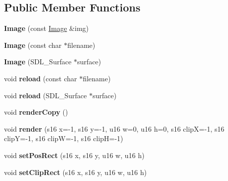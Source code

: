 \subsection*{Public Member Functions}
\begin{DoxyCompactItemize}
\item 
\hypertarget{classImage_aa44ed77d00d96d2c878b050835f828c4}{{\bfseries Image} (const \hyperlink{classImage}{Image} \&img)}\label{classImage_aa44ed77d00d96d2c878b050835f828c4}

\item 
\hypertarget{classImage_a9700f58efb58b13e23666f19c67d3839}{{\bfseries Image} (const char $\ast$filename)}\label{classImage_a9700f58efb58b13e23666f19c67d3839}

\item 
\hypertarget{classImage_af7e0eee4779e4621a9f6e296800c7d52}{{\bfseries Image} (S\-D\-L\-\_\-\-Surface $\ast$surface)}\label{classImage_af7e0eee4779e4621a9f6e296800c7d52}

\item 
\hypertarget{classImage_a0ca4eb012dd12fdb94ad4dbbe963aae4}{void {\bfseries reload} (const char $\ast$filename)}\label{classImage_a0ca4eb012dd12fdb94ad4dbbe963aae4}

\item 
\hypertarget{classImage_afd1a0b923fbe8db507ed72cf163ddd05}{void {\bfseries reload} (S\-D\-L\-\_\-\-Surface $\ast$surface)}\label{classImage_afd1a0b923fbe8db507ed72cf163ddd05}

\item 
\hypertarget{classImage_a1db998ce4cfeaf7d8ec355b9afe9e823}{void {\bfseries render\-Copy} ()}\label{classImage_a1db998ce4cfeaf7d8ec355b9afe9e823}

\item 
\hypertarget{classImage_afbc635e6974fdf797902f77c5b62848d}{void {\bfseries render} (s16 x=-\/1, s16 y=-\/1, u16 w=0, u16 h=0, s16 clip\-X=-\/1, s16 clip\-Y=-\/1, s16 clip\-W=-\/1, s16 clip\-H=-\/1)}\label{classImage_afbc635e6974fdf797902f77c5b62848d}

\item 
\hypertarget{classImage_a61a65d01ff669ad0cb1221efbcfc679d}{void {\bfseries set\-Pos\-Rect} (s16 x, s16 y, u16 w, u16 h)}\label{classImage_a61a65d01ff669ad0cb1221efbcfc679d}

\item 
\hypertarget{classImage_ad262841ddd13f890ab67032982176bde}{void {\bfseries set\-Clip\-Rect} (s16 x, s16 y, u16 w, u16 h)}\label{classImage_ad262841ddd13f890ab67032982176bde}


\end{DoxyCompactItemize}

